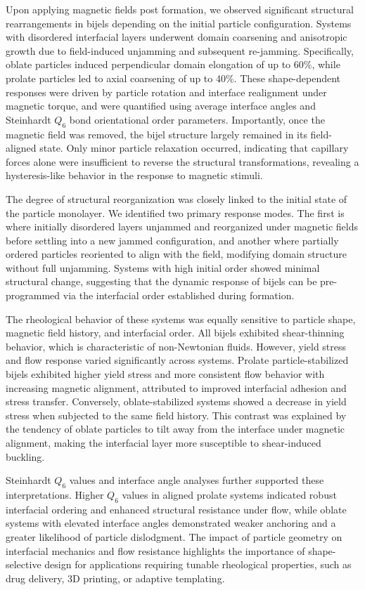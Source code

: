 Upon applying magnetic fields post formation, we observed significant structural rearrangements in bijels depending on the initial particle 
configuration. Systems with disordered interfacial layers underwent domain coarsening and anisotropic growth due to field-induced unjamming 
and subsequent re-jamming. Specifically, oblate particles induced perpendicular domain elongation of up to 60\%, while prolate particles led 
to axial coarsening of up to 40\%. These shape-dependent responses were driven by particle rotation and interface realignment under magnetic 
torque, and were quantified using average interface angles and Steinhardt $Q_6$ bond orientational order parameters. Importantly, once the 
magnetic field was removed, the bijel structure largely remained in its field-aligned state. Only minor particle relaxation occurred, 
indicating that capillary forces alone were insufficient to reverse the structural transformations, revealing a hysteresis-like behavior 
in the response to magnetic stimuli.

The degree of structural reorganization was closely linked to the initial state of the particle monolayer. We identified two primary 
response modes. The first is where initially disordered layers unjammed and reorganized under magnetic fields before settling into a new 
jammed configuration, and another where partially ordered particles reoriented to align with the field, modifying domain structure 
without full unjamming. Systems with high initial order showed minimal structural change, suggesting that the dynamic response of bijels 
can be pre-programmed via the interfacial order established during formation.

The rheological behavior of these systems was equally sensitive to particle shape, magnetic field history, and interfacial order. All 
bijels exhibited shear-thinning behavior, which is characteristic of non-Newtonian fluids. However, yield stress and flow 
response varied significantly across systems. Prolate particle-stabilized bijels exhibited higher yield stress and more consistent flow 
behavior with increasing magnetic alignment, attributed to improved interfacial adhesion and stress transfer. Conversely, oblate-stabilized 
systems showed a decrease in yield stress when subjected to the same field history. This contrast was explained by the tendency of oblate 
particles to tilt away from the interface under magnetic alignment, making the interfacial layer more susceptible to shear-induced buckling.

Steinhardt $Q_6$ values and interface angle analyses further supported these interpretations. Higher $Q_6$ values in aligned prolate systems 
indicated robust interfacial ordering and enhanced structural resistance under flow, while oblate systems with elevated interface angles 
demonstrated weaker anchoring and a greater likelihood of particle dislodgment. The impact of particle geometry on interfacial mechanics 
and flow resistance highlights the importance of shape-selective design for applications requiring tunable rheological properties, such as 
drug delivery, 3D printing, or adaptive templating.

